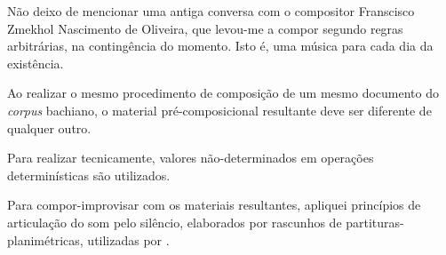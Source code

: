 Não deixo de mencionar uma antiga conversa com o compositor Franscisco Zmekhol Nascimento de Oliveira, que levou-me a compor segundo regras arbitrárias, na contingência do momento. Isto é, uma música para cada dia da existência. 

Ao realizar o mesmo procedimento de composição de um mesmo documento do \emph{corpus} bachiano, o material pré-composicional resultante deve ser diferente de qualquer outro. 

Para realizar tecnicamente, valores não-determinados em operações determinísticas são utilizados.

Para compor-improvisar com os materiais resultantes, apliquei princípios de articulação do som pelo silêncio, elaborados por rascunhos de partituras-planimétricas, utilizadas por \cite{koellreutter_introducao_1987}.